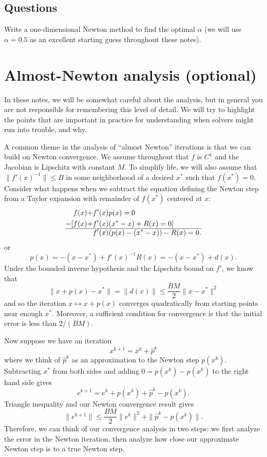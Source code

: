 \documentclass[12pt, leqno]{article} %
\begin{document}
\subsection{Questions}

Write a one-dimensional Newton method to find the optimal \(\alpha\) (we
will use \(\alpha = 0.5\) as an excellent starting guess throughout
these notes).

\section{Almost-Newton analysis (optional)}

In these notes, we will be somewhat careful about the analysis, but in
general you are not responsible for remembering this level of detail. We
will try to highlight the points that are important in practice for
understanding when solvers might run into trouble, and why.

A common theme in the analysis of ``almost Newton'' iterations is that
we can build on Newton convergence. We assume throughout that \(f\) is
\(C^1\) and the Jacobian is Lipschitz with constant \(M\). To simplify
life, we will also assume that \(\|f'(x)^{-1}\| \leq B\) in some
neighborhood of a desired \(x^*\) such that \(f(x^*) = 0\). Consider
what happens when we subtract the equation defining the Newton step from
a Taylor expansion with remainder of \(f(x^*)\) centered at \(x\):
\begin{align*}
  f(x) + &f'(x) p(x) = 0 \\
-[f(x) + &f'(x)(x^*-x) + R(x) = 0] \\\hline
         &f'(x)(p(x)-(x^*-x)) - R(x) = 0.
\end{align*} or \[p(x) = -(x-x^*) + f'(x)^{-1} R(x) = -(x-x^*) + d(x).\]
Under the bounded inverse hypothesis and the Lipschitz bound on \(f'\),
we know that
\[\|x + p(x) - x^*\| = \|d(x)\| \leq \frac{BM}{2} \|x-x^*\|^2\] and so
the iteration \(x \mapsto x + p(x)\) converges quadratically from
starting points near enough \(x^*\). Moreover, a sufficient condition
for convergence is that the initial error is less than \(2/(BM)\).

Now suppose we have an iteration \[x^{k+1} = x^k + \hat{p}^k\] where we
think of \(\hat{p}^k\) as an approximation to the Newton step
\(p(x^k)\). Subtracting \(x^*\) from both sides and adding
\(0 = p(x^k)-p(x^k)\) to the right hand side gives
\[e^{k+1} = e^k + p(x^k) + \hat{p}^k - p(x^k).\] Triangle inequality and
our Newton convergence result gives
\[\|e^{k+1}\| \leq \frac{BM}{2} \|e^k\|^2 + \|\hat{p}^k - p(x^k)\|.\]
Therefore, we can think of our convergence analysis in two steps: we
first analyze the error in the Newton iteration, then analyze how close
our approximate Newton step is to a true Newton step.
\end{document}
